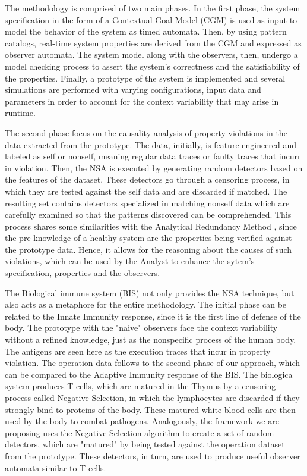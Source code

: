 The methodology is comprised of two main phases. In the first phase, the system specification in the form of a Contextual Goal Model (CGM) is used as input to model the behavior of the system as timed automata. Then, by using pattern catalogs, real-time system properties are derived from the CGM and expressed as observer automata. The system model along with the observers, then, undergo a model checking process to assert the system's correctness and the satisfiability of the properties. Finally, a prototype of the system is implemented and several simulations are performed with varying configurations, input data and parameters in order to account for the context variability that may arise in runtime. 

The second phase focus on the causality analysis of property violations in the data extracted from the prototype. The data, initially, is feature engineered and labeled as self or nonself, meaning regular data traces or faulty traces that incurr in violation. Then, the NSA is executed by generating random detectors based on the features of the dataset. These detectors go through a censoring process, in which they are tested against the self data and are discarded if matched. The resulting set contains detectors specialized in matching nonself data which are carefully examined so that the patterns discovered can be comprehended. This process shares some similarities with the Analytical Redundancy Method \cite{gao2015survey}, since the pre-knowledge of a healthy system are the properties being verified against the prototype data. Hence, it allows for the reasoning about the causes of such violations, which can be used by the Analyst to enhance the sytem's specification, properties and the observers.

The Biological immune system (BIS) not only provides the NSA technique, but also acts as a metaphore for the entire methodology. The initial phase can be related to the Innate Immunity response, since it is the first line of defense of the body. The prototype with the "naive" observers face the context variability without a refined knowledge, just as the nonspecific process of the human body. The antigens are seen here as the execution traces that incur in property violation. The operation data follows to the second phase of our approach, which can be compared to the Adaptive Immunity response of the BIS. The biologica system produces T cells, which are matured in the Thymus by a censoring process called Negative Selection, in which the lymphocytes are discarded if they strongly bind to proteins of the body. These matured white blood cells are then used by the body to combat pathogens. Analogously, the framework we are proposing uses the Negative Selection algorithm to create a set of random detectors, which are "matured" by being tested against the operation dataset from the prototype. These detectors, in turn, are used to produce useful observer automata similar to T cells. 

